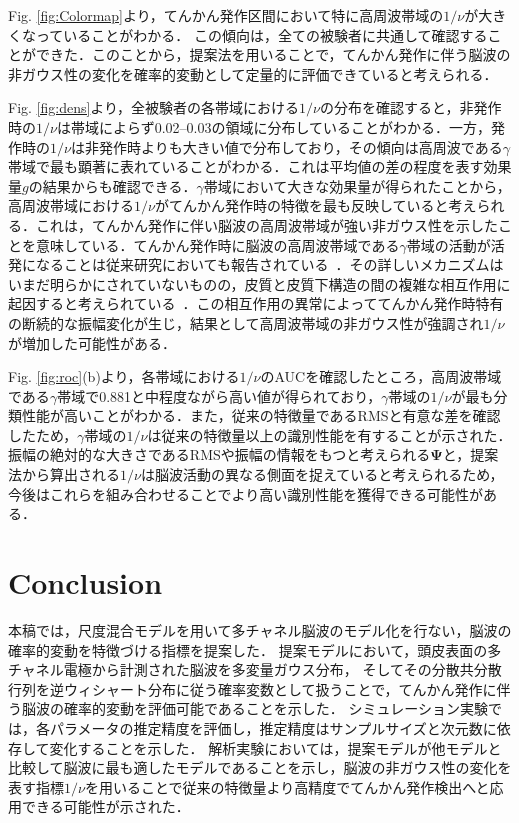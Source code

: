\documentclass[journal]{IEEEtran}
\begin{document}
Fig. \ref{fig:Colormap}より，てんかん発作区間において特に高周波帯域の$1/\nu$が大きくなっていることがわかる．
この傾向は，全ての被験者に共通して確認することができた．このことから，提案法を用いることで，てんかん発作に伴う脳波の非ガウス性の変化を確率的変動として定量的に評価できていると考えられる．

Fig. \ref{fig:dens}より，全被験者の各帯域における$1/\nu$の分布を確認すると，非発作時の$1/\nu$は帯域によらず0.02--0.03の領域に分布していることがわかる．一方，発作時の$1/\nu$は非発作時よりも大きい値で分布しており，その傾向は高周波である$\gamma$帯域で最も顕著に表れていることがわかる．これは平均値の差の程度を表す効果量$g$の結果からも確認できる．$\gamma$帯域において大きな効果量が得られたことから，高周波帯域における$1/\nu$がてんかん発作時の特徴を最も反映していると考えられる．これは，てんかん発作に伴い脳波の高周波帯域が強い非ガウス性を示したことを意味している．てんかん発作時に脳波の高周波帯域である$\gamma$帯域の活動が活発になることは従来研究においても報告されている~\cite{Kobayashi2004,Kobayashi2009,Benedek2016}．その詳しいメカニズムはいまだ明らかにされていないものの，皮質と皮質下構造の間の複雑な相互作用に起因すると考えられている~\cite{Kobayashi2004}．この相互作用の異常によっててんかん発作時特有の断続的な振幅変化が生じ，結果として高周波帯域の非ガウス性が強調され$1/\nu$が増加した可能性がある．

Fig. \ref{fig:roc}(b)より，各帯域における$1/\nu$のAUCを確認したところ，高周波帯域である$\gamma$帯域で0.881と中程度ながら高い値が得られており，$\gamma$帯域の$1/\nu$が最も分類性能が高いことがわかる．また，従来の特徴量であるRMSと有意な差を確認したため，$\gamma$帯域の$1/\nu$は従来の特徴量以上の識別性能を有することが示された．振幅の絶対的な大きさであるRMSや振幅の情報をもつと考えられる$\mathbf{\Psi}$と，提案法から算出される$1/\nu$は脳波活動の異なる側面を捉えていると考えられるため，今後はこれらを組み合わせることでより高い識別性能を獲得できる可能性がある．

\section{Conclusion}
本稿では，尺度混合モデルを用いて多チャネル脳波のモデル化を行ない，脳波の確率的変動を特徴づける指標を提案した．
提案モデルにおいて，頭皮表面の多チャネル電極から計測された脳波を多変量ガウス分布，
そしてその分散共分散行列を逆ウィシャート分布に従う確率変数として扱うことで，てんかん発作に伴う脳波の確率的変動を評価可能であることを示した．
シミュレーション実験では，各パラメータの推定精度を評価し，推定精度はサンプルサイズと次元数に依存して変化することを示した．
解析実験においては，提案モデルが他モデルと比較して脳波に最も適したモデルであることを示し，脳波の非ガウス性の変化を表す指標$1/\nu$を用いることで従来の特徴量より高精度でてんかん発作検出へと応用できる可能性が示された．
\end{document}
